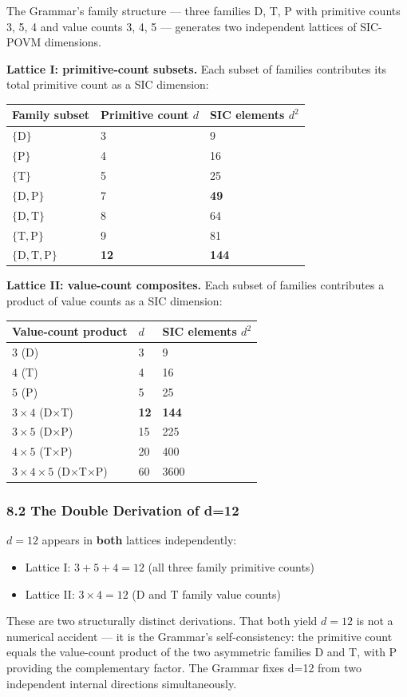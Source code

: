 \documentclass[12pt,a4paper]{article}
\begin{document}
The Grammar's family structure --- three families D, T, P with primitive
counts 3, 5, 4 and value counts 3, 4, 5 --- generates two independent
lattices of SIC-POVM dimensions.

\textbf{Lattice I: primitive-count subsets.} Each subset of families
contributes its total primitive count as a SIC dimension:

\begin{longtable}[]{@{}lll@{}}
\toprule
Family subset & Primitive count \(d\) & SIC elements
\(d^2\)\tabularnewline
\midrule
\endhead
\(\{\mathrm{D}\}\) & 3 & 9\tabularnewline
\(\{\mathrm{P}\}\) & 4 & 16\tabularnewline
\(\{\mathrm{T}\}\) & 5 & 25\tabularnewline
\(\{\mathrm{D,P}\}\) & 7 & \textbf{49}\tabularnewline
\(\{\mathrm{D,T}\}\) & 8 & 64\tabularnewline
\(\{\mathrm{T,P}\}\) & 9 & 81\tabularnewline
\(\{\mathrm{D,T,P}\}\) & \textbf{12} & \textbf{144}\tabularnewline
\bottomrule
\end{longtable}

\textbf{Lattice II: value-count composites.} Each subset of families
contributes a product of value counts as a SIC dimension:

\begin{longtable}[]{@{}lll@{}}
\toprule
Value-count product & \(d\) & SIC elements \(d^2\)\tabularnewline
\midrule
\endhead
\(3\) (D) & 3 & 9\tabularnewline
\(4\) (T) & 4 & 16\tabularnewline
\(5\) (P) & 5 & 25\tabularnewline
\(3 \times 4\) (D×T) & \textbf{12} & \textbf{144}\tabularnewline
\(3 \times 5\) (D×P) & 15 & 225\tabularnewline
\(4 \times 5\) (T×P) & 20 & 400\tabularnewline
\(3 \times 4 \times 5\) (D×T×P) & 60 & 3600\tabularnewline
\bottomrule
\end{longtable}

\hypertarget{the-double-derivation-of-d12}{%
\subsubsection{8.2 The Double Derivation of
d=12}\label{the-double-derivation-of-d12}}

\(d=12\) appears in \textbf{both} lattices independently:

\begin{itemize}
\tightlist
\item
  Lattice I: \(3 + 5 + 4 = 12\) (all three family primitive counts)
\item
  Lattice II: \(3 \times 4 = 12\) (D and T family value counts)
\end{itemize}

These are two structurally distinct derivations. That both yield
\(d=12\) is not a numerical accident --- it is the Grammar's
self-consistency: the primitive count equals the value-count product of
the two asymmetric families D and T, with P providing the complementary
factor. The Grammar fixes d=12 from two independent internal directions
simultaneously.
\end{document}
